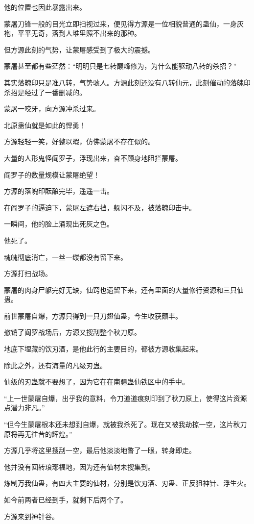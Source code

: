 \begin{this_body}
他的位置也因此暴露出来。

蒙屠刀锋一般的目光立即扫视过来，便见得方源是一位相貌普通的蛊仙，一身灰袍，平平无奇，落到人堆里照不出来的那种。

但方源此刻的气势，让蒙屠感受到了极大的震撼。

蒙屠甚至都有些茫然：“明明只是七转巅峰修为，为什么能驱动八转的杀招？”

其实落魄印只是准八转，气势骇人。方源此刻还没有八转仙元，此刻催动的落魄印杀招是经过了一番删减的。

蒙屠一咬牙，向方源冲杀过来。

北原蛊仙就是如此的悍勇！

方源轻轻一笑，好整以暇，仿佛蒙屠不存在似的。

大量的人形鬼怪阎罗子，浮现出来，奋不顾身地阻拦蒙屠。

阎罗子的数量规模让蒙屠绝望！

方源的落魄印酝酿完毕，遥遥一击。

在阎罗子的逼迫下，蒙屠左遮右挡，躲闪不及，被落魄印击中。

一瞬间，他的脸上涌现出死灰之色。

他死了。

魂魄彻底消亡，一丝一缕都没有留下来。

方源打扫战场。

蒙屠的肉身尸躯完好无缺，仙窍也遗留下来，还有里面的大量修行资源和三只仙蛊。

前世蒙屠自爆，方源只得到一只刀翅仙蛊，今生收获颇丰。

撤销了阎罗战场后，方源又搜刮整个秋刀原。

地底下埋藏的饮刃酒，是他此行的主要目的，都被方源收集起来。

除此之外，还有海量的凡级刃蛊。

仙级的刃蛊就不要想了，因为它在在南疆蛊仙铁区中的手中。

“上一世蒙屠自爆，出乎我的意料，令刀道道痕刻印到了秋刀原上，使得这片资源点潜力非凡。”

“但今生蒙屠根本还未想到自爆，就被我杀死了。现在又被我劫掠一空，这片秋刀原将再无往昔的辉煌。”

方源几乎将这里搜刮一空，最后他淡淡地瞥了一眼，转身即走。

他并没有回转琅琊福地，因为还有仙材未搜集到。

炼制万我仙蛊，有四大主要的仙材，分别是饮刃酒、刃蛊、正反狙神针、浮生火。

如今前两者已经到手，就剩下后两个了。

方源来到神针谷。


\end{this_body}
